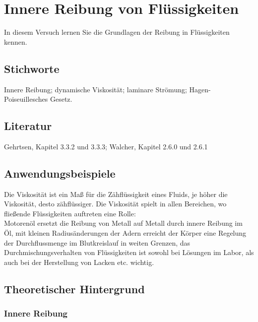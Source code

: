 \chapter{Innere Reibung von Flüssigkeiten}
\label{v:4}

In diesem Versuch lernen Sie die Grundlagen der Reibung in Flüssigkeiten kennen.

\section{Stichworte}

Innere Reibung; dynamische Viskosität; laminare Strömung; Hagen-Poiseuillesches Gesetz.
%
\section{Literatur}

Gehrtsen, Kapitel 3.3.2 und 3.3.3; Walcher, Kapitel 2.6.0 und 2.6.1
%
\section{Anwendungsbeispiele}
%
Die Viskosität ist ein Maß für die Zähflüssigkeit eines Fluids, je höher die Viskosität, desto zähflüssiger. Die Viskosität spielt in allen Bereichen, wo fließende Flüssigkeiten auftreten eine Rolle:\\
Motorenöl ersetzt die Reibung von Metall auf Metall durch innere Reibung im Öl, mit kleinen Radiusänderungen der Adern erreicht der Körper eine Regelung der Durchflussmenge im Blutkreislauf in weiten Grenzen, das Durchmischungsverhalten von Flüssigkeiten ist sowohl bei Lösungen im Labor, als auch bei der Herstellung von Lacken etc. wichtig.
%
\section{Theoretischer Hintergrund}

\subsection{Innere Reibung}

